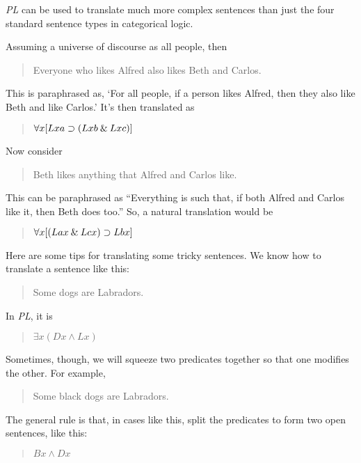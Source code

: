 \documentclass[../logic-text.tex]{subfiles}
\begin{document}
\emph{PL} can be used to translate much more complex sentences than just the four standard sentence types in categorical logic.


Assuming a universe of discourse as all people, then

\begin{quote}
  Everyone who likes Alfred also likes Beth and Carlos.
\end{quote}

This is paraphrased as, \enquote*{For all people, if a person likes Alfred, then they also like Beth and like Carlos.}
It's then translated as 

\begin{quote}
  \(\forall x[Lxa \supset (Lxb \mathbin{\&} Lxc)]\)
\end{quote}

Now consider

\begin{quote}
  Beth likes anything that Alfred and Carlos like.
\end{quote}

This can be paraphrased as \enquote{Everything is such that, if both Alfred and Carlos like it, then Beth does too.}
So, a natural translation would be

\begin{quote}
  \(\forall x[(Lax \mathbin{\&} Lcx) \supset Lbx]\)
\end{quote}

Here are some tips for translating some tricky sentences. We know how to translate a sentence like this:

\begin{quote}
  Some dogs are Labradors.
\end{quote}

In \emph{PL}, it is

\begin{quote}
  \(\exists x(Dx \land Lx)\)
\end{quote}

Sometimes, though, we will squeeze two predicates together so that one modifies the other. For example,

\begin{quote}
  Some black dogs are Labradors.
\end{quote}

The general rule is that, in cases like this, split the predicates to form two open sentences, like this:

\begin{quote}
  \(Bx \land Dx\)
\end{quote}
\end{document}
